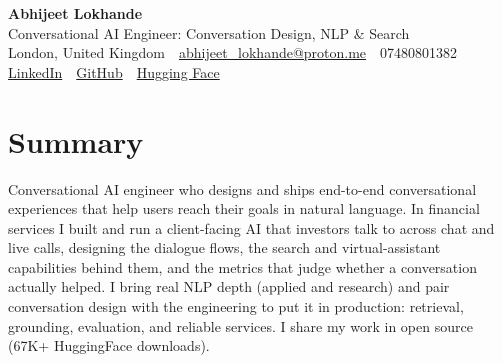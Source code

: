 \documentclass[10pt,a4paper]{article}
\newcommand{\sep}{\,\textcolor{accent!60}{\textbar}\,}
\begin{document}
\begin{center}
  {\fontsize{24}{26}\selectfont\bfseries Abhijeet Lokhande}\\[3pt]
  {\color{accent}\large Conversational AI Engineer: Conversation Design, NLP \& Search}\\[5pt]
  {\small
    London, United Kingdom \sep
    \href{mailto:abhijeet_lokhande@proton.me}{abhijeet\_lokhande@proton.me} \sep
    07480801382 \\[2pt]
    \href{https://www.linkedin.com/in/ablds/}{LinkedIn} \sep
    \href{https://github.com/abhijeetscode}{GitHub} \sep
    \href{https://huggingface.co/ab-ai}{Hugging Face}
  }
\end{center}
\vspace{2pt}

\section{Summary}
Conversational AI engineer who designs and ships end-to-end conversational experiences that help users reach their goals in natural language. In financial services I built and run a client-facing AI that investors talk to across chat and live calls, designing the dialogue flows, the search and virtual-assistant capabilities behind them, and the metrics that judge whether a conversation actually helped. I bring real NLP depth (applied and research) and pair conversation design with the engineering to put it in production: retrieval, grounding, evaluation, and reliable services. I share my work in open source (67K+ HuggingFace downloads).

\end{document}
